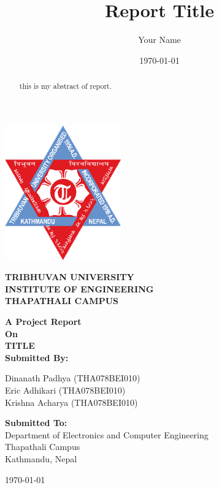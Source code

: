 \documentclass{report}
\begin{document}
\fontsize{12}{14.4}
\noindent
\title{Report Title}
\author{Your Name}
\date{\today}
\begin{titlepage}
    \begin{center}
        \includegraphics[width=5cm]{img/logo.png}

        {\fontsize{12}{14.4} \bfseries \centering TRIBHUVAN UNIVERSITY \\ INSTITUTE OF ENGINEERING \\ THAPATHALI CAMPUS \\ }

        \vspace{1.5cm}
        {\bfseries A Project Report \\ On \\ TITLE \linebreak[5] \\ Submitted By: \\ }

        Dinanath Padhya (THA078BEI010) \\
        Eric Adhikari (THA078BEI010) \\
        Krishna Acharya (THA078BEI010) \linebreak[4]

        {\bfseries Submitted To:} \\
        Department of Electronics and Computer Engineering \\
        Thapathali Campus \\
        Kathmandu, Nepal \linebreak[5]

        \today \\
    \end{center}
\end{titlepage}
\begin{abstract}
this is my abstract of report.
\end{abstract}

\tableofcontents

\listoffigures
\listoftables

% 
% 
% 
% 
%
% 
%
\end{document}
